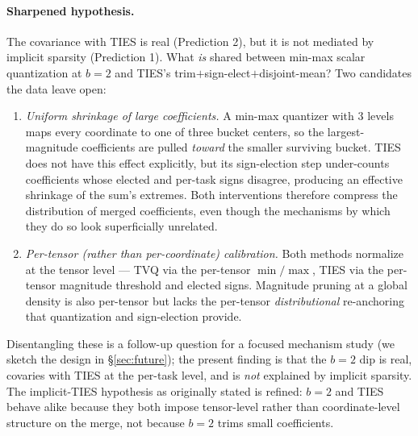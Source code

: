 \paragraph{Sharpened hypothesis.}
The covariance with TIES is real (Prediction 2), but it is
not mediated by implicit sparsity (Prediction 1). What \emph{is}
shared between min-max scalar quantization at $b=2$ and
TIES's trim$+$sign-elect$+$disjoint-mean? Two candidates the
data leave open:
\begin{enumerate}
\item \emph{Uniform shrinkage of large coefficients.} A min-max
quantizer with $3$ levels maps every coordinate to one of three
bucket centers, so the largest-magnitude coefficients are
pulled \emph{toward} the smaller surviving bucket. TIES does
not have this effect explicitly, but its sign-election step
under-counts coefficients whose elected and per-task signs
disagree, producing an effective shrinkage of the sum's
extremes. Both interventions therefore compress the
distribution of merged coefficients, even though the
mechanisms by which they do so look superficially unrelated.
\item \emph{Per-tensor (rather than per-coordinate) calibration.}
Both methods normalize at the tensor level --- TVQ via the
per-tensor $\min/\max$, TIES via the per-tensor magnitude
threshold and elected signs. Magnitude pruning at a global
density is also per-tensor but lacks the per-tensor
\emph{distributional} re-anchoring that quantization and
sign-election provide.
\end{enumerate}
Disentangling these is a follow-up question for a focused
mechanism study (we sketch the design in
\S\ref{sec:future}); the present finding is that the $b=2$ dip
is real, covaries with TIES at the per-task level, and is
\emph{not} explained by implicit sparsity. The implicit-TIES
hypothesis as originally stated is refined: $b=2$ and TIES
behave alike because they both impose tensor-level rather than
coordinate-level structure on the merge, not because $b=2$
trims small coefficients.

